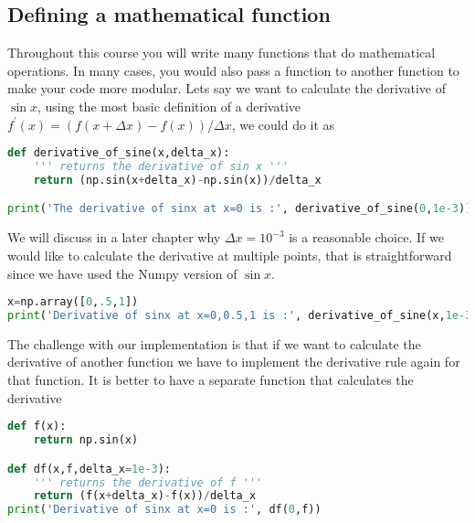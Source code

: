 \documentclass[graybox,sectrefs,envcountresetchap,open=right,final]{svmonodo}
\begin{document}
\subsection{Defining a mathematical function}
Throughout this course you will write many functions that do mathematical operations. In many cases, you would also pass a function to another function to make your code more modular. Lets say we want to calculate the derivative of $\sin x$, using the most basic definition of a derivative $f^\prime(x) = (f(x+\Delta x)-f(x))/\Delta x$, we could do it as






\begin{lstlisting}[language=python,style=blue1bar]
def derivative_of_sine(x,delta_x):
    ''' returns the derivative of sin x '''
    return (np.sin(x+delta_x)-np.sin(x))/delta_x

print('The derivative of sinx at x=0 is :', derivative_of_sine(0,1e-3))

\end{lstlisting}

We will discuss in a later chapter why $\Delta x=10^{-3}$ is a reasonable choice. 
If we would like to calculate the derivative at multiple points, that is straightforward since we have used the Numpy version of $\sin x$.



\begin{lstlisting}[language=python,style=blue1bar]
x=np.array([0,.5,1])
print('Derivative of sinx at x=0,0.5,1 is :', derivative_of_sine(x,1e-3))

\end{lstlisting}

The challenge with our implementation is that if we want to calculate the derivative of another function we have to implement the derivative rule again for that function. It is better to have a separate function that calculates the derivative








\begin{lstlisting}[language=python,style=blue1bar]
def f(x):
    return np.sin(x)

def df(x,f,delta_x=1e-3):
    ''' returns the derivative of f '''
    return (f(x+delta_x)-f(x))/delta_x
print('Derivative of sinx at x=0 is :', df(0,f))

\end{lstlisting}
\end{document}
